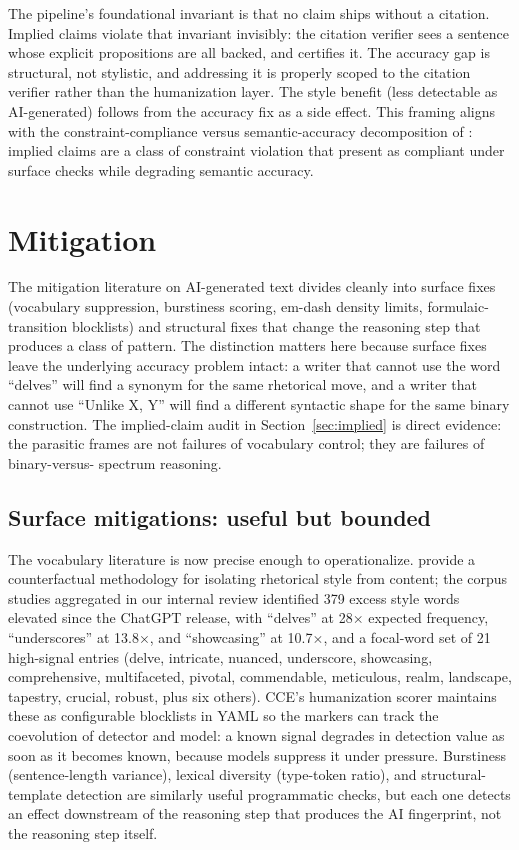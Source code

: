 \documentclass[11pt]{article}
\begin{document}
The pipeline's foundational invariant is that no claim ships without a
citation. Implied claims violate that invariant invisibly: the citation
verifier sees a sentence whose explicit propositions are all backed,
and certifies it. The accuracy gap is structural, not stylistic, and
addressing it is properly scoped to the citation verifier rather than the
humanization layer. The style benefit (less detectable as AI-generated) follows from the
accuracy fix as a side effect. This framing aligns with the
constraint-compliance versus
semantic-accuracy decomposition of \citet{baxi_compliance_2025}: implied
claims are a class of constraint violation that present as compliant under
surface checks while degrading semantic accuracy.

\section{Mitigation}
\label{sec:mitigation}

The mitigation literature on AI-generated text divides cleanly into
surface fixes (vocabulary suppression, burstiness scoring, em-dash
density limits, formulaic-transition blocklists) and structural fixes
that change the reasoning step that produces a class of pattern. The
distinction matters here because surface fixes leave the underlying
accuracy problem intact: a writer that cannot use the word ``delves''
will find a synonym for the same rhetorical move, and a writer that
cannot use ``Unlike X, Y'' will find a different syntactic shape for
the same binary construction. The implied-claim audit in
Section~\ref{sec:implied} is direct evidence: the parasitic frames are
not failures of vocabulary control; they are failures of binary-versus-
spectrum reasoning.

\subsection{Surface mitigations: useful but bounded}

The vocabulary literature is now precise enough to operationalize.
\citet{qiu_rhetorical_2025} provide a counterfactual methodology for
isolating rhetorical style from content; the corpus studies aggregated
in our internal review identified 379 excess style words elevated since
the ChatGPT release, with ``delves'' at 28$\times$ expected frequency,
``underscores'' at 13.8$\times$, and ``showcasing'' at 10.7$\times$, and
a focal-word set of 21 high-signal entries (delve, intricate, nuanced,
underscore, showcasing, comprehensive, multifaceted, pivotal,
commendable, meticulous, realm, landscape, tapestry, crucial, robust,
plus six others). CCE's humanization scorer maintains these as
configurable blocklists in YAML so the markers can track the
coevolution of detector and model: a known signal degrades in detection
value as soon as it becomes known, because models suppress it under
pressure. Burstiness (sentence-length variance), lexical diversity
(type-token ratio), and structural-template detection are similarly
useful programmatic checks, but each one detects an effect downstream
of the reasoning step that produces the AI fingerprint, not the
reasoning step itself.
\end{document}
